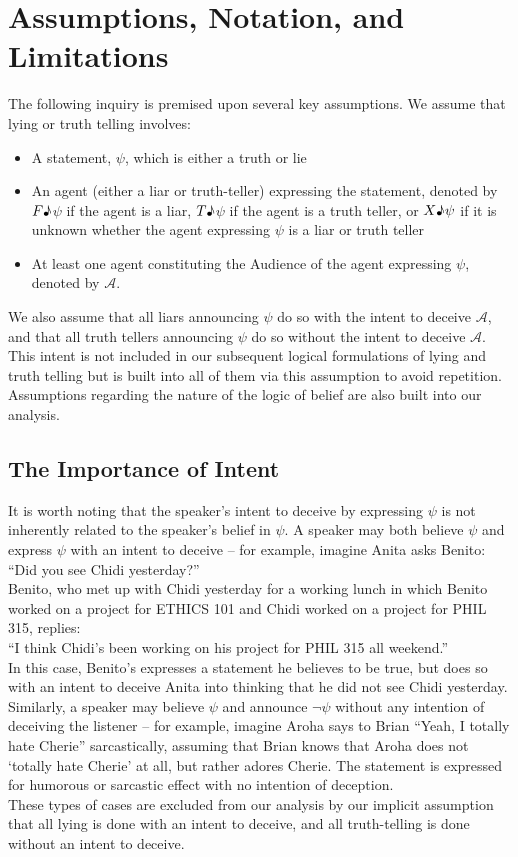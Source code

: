 \documentclass[12pt, titlepage, twoside, a4paper]{report}
\newcommand{\true}{$T\text{\textmusicalnote}$}
\newcommand{\false}{$F\text{\textmusicalnote}$}
\begin{document}
\section{Assumptions, Notation, and Limitations}
The following inquiry is premised upon several key assumptions. 
We assume that lying or truth telling involves: 
\begin{itemize}
\item A statement, $\psi$, which is either a truth or lie 
\item An agent (either a liar or truth-teller) expressing the statement, denoted by \false$\psi$ if the agent is a liar, \true$\psi$ if the agent is a truth teller, or $X \text{\textmusicalnote} \psi$ if it is unknown whether the agent expressing $\psi$ is a liar or truth teller 
\item At least one agent constituting the Audience of the agent expressing $\psi$, denoted by $\mathcal{A}$.
\end{itemize}
We also assume that all liars announcing $\psi$ do so with the intent to deceive $\mathcal{A}$, and that all truth tellers announcing $\psi$ do so without the intent to deceive $\mathcal{A}$. This intent is not included in our subsequent logical formulations of lying and truth telling but is built into all of them via this assumption to avoid repetition. Assumptions regarding the nature of the logic of belief are also built into our analysis.

\subsection{The Importance of Intent}
It is worth noting that the speaker's intent to deceive by expressing $\psi$ is not inherently related to the speaker's belief in $\psi$. A speaker may both believe $\psi$ and express $\psi$ with an intent to deceive – for example, imagine Anita asks Benito:\\
 ``Did you see Chidi yesterday?''\\
Benito, who met up with Chidi yesterday for a working lunch in which Benito worked on a project for ETHICS 101 and Chidi worked on a project for PHIL 315, replies:\\
 ``I think Chidi's been working on his project for PHIL 315 all weekend.''\\
 In this case, Benito's expresses a statement he believes to be true, but does so with an intent to deceive Anita into thinking that he did not see Chidi yesterday.\\
Similarly, a speaker may believe $\psi$ and announce $\neg \psi$ without any intention of deceiving the listener – for example, imagine Aroha says to Brian ``Yeah, I totally hate Cherie'' sarcastically, assuming that Brian knows that Aroha does not `totally hate Cherie' at all, but rather adores Cherie. The statement is expressed for humorous or sarcastic effect with no intention of deception.\\
These types of cases are excluded from our analysis by our implicit assumption that all lying is done with an intent to deceive, and all truth-telling is done without an intent to deceive.
\end{document}
